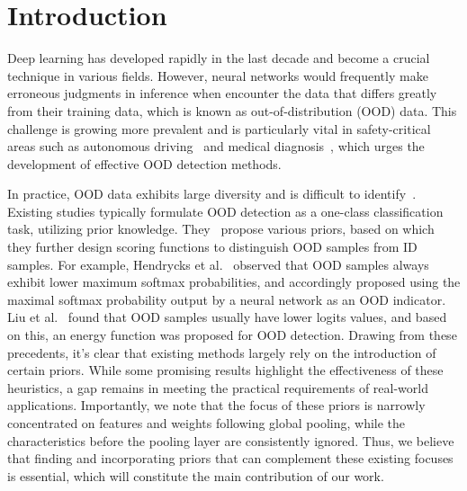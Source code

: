 \section{Introduction}
\label{sec:intro}

Deep learning has developed rapidly in the last decade and become a crucial technique in various fields. 
However, neural networks would frequently make erroneous judgments in inference when encounter  the data  that differs greatly from their training data, which is known as out-of-distribution (OOD) data. This challenge is growing more prevalent and is particularly vital in safety-critical areas such as autonomous driving~\cite{filos2020can, janai2020computer} and medical diagnosis~\cite{pooch2020can}, which urges the development of effective OOD detection methods.

In practice, OOD data exhibits   large diversity and is difficult to identify~\cite{yang2021generalized_survey}.
Existing studies typically formulate OOD detection as a one-class classification task, utilizing prior knowledge. They~\cite{hendrycks2016msp, liu2020energy, yu2023block}  propose various priors, based on which  they further design scoring functions to distinguish OOD samples from ID samples.
For example, Hendrycks et al.~\cite{hendrycks2016msp}  observed that OOD samples always exhibit lower maximum softmax probabilities, and accordingly proposed using the maximal softmax probability output by a neural network as an OOD indicator. Liu et al.~\cite{liu2020energy} found that OOD samples usually have lower logits values, and based on this, an energy function was proposed for OOD detection.
Drawing from these precedents, it's clear that existing methods largely rely on the introduction of certain priors.  While some promising results highlight the effectiveness of these heuristics, a gap remains in meeting the practical requirements of real-world applications. Importantly, we note that the focus of these priors is narrowly concentrated on features and weights following global pooling, while the characteristics before the pooling layer are consistently ignored. Thus, we believe that finding and incorporating priors that can complement these existing focuses is essential, which will constitute the main contribution of our work.


